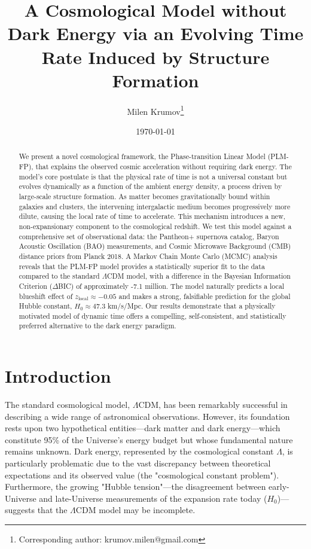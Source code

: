\documentclass[12pt, a4paper]{article}
\title{%
    A Cosmological Model without Dark Energy via an Evolving Time Rate Induced by Structure Formation
}
\author[1]{Milen Krumov\thanks{Corresponding author: krumov.milen@gmail.com}}
\affil[1]{Independent Researcher}
\date{\today}
\begin{document}
\maketitle

\begin{abstract}
We present a novel cosmological framework, the Phase-transition Linear Model (PLM-FP), that explains the observed cosmic acceleration without requiring dark energy. The model's core postulate is that the physical rate of time is not a universal constant but evolves dynamically as a function of the ambient energy density, a process driven by large-scale structure formation. As matter becomes gravitationally bound within galaxies and clusters, the intervening intergalactic medium becomes progressively more dilute, causing the local rate of time to accelerate. This mechanism introduces a new, non-expansionary component to the cosmological redshift. We test this model against a comprehensive set of observational data: the Pantheon+ supernova catalog, Baryon Acoustic Oscillation (BAO) measurements, and Cosmic Microwave Background (CMB) distance priors from Planck 2018. A Markov Chain Monte Carlo (MCMC) analysis reveals that the PLM-FP model provides a statistically superior fit to the data compared to the standard $\Lambda$CDM model, with a difference in the Bayesian Information Criterion ($\Delta$BIC) of approximately -7.1 million. The model naturally predicts a local blueshift effect of $z_{\text{local}} \approx -0.05$ and makes a strong, falsifiable prediction for the global Hubble constant, $H_0 \approx 47.3$ km/s/Mpc. Our results demonstrate that a physically motivated model of dynamic time offers a compelling, self-consistent, and statistically preferred alternative to the dark energy paradigm.
\end{abstract}

\section{Introduction}
The standard cosmological model, $\Lambda$CDM, has been remarkably successful in describing a wide range of astronomical observations. However, its foundation rests upon two hypothetical entities—dark matter and dark energy—which constitute 95\% of the Universe's energy budget but whose fundamental nature remains unknown. Dark energy, represented by the cosmological constant $\Lambda$, is particularly problematic due to the vast discrepancy between theoretical expectations and its observed value (the "cosmological constant problem"). Furthermore, the growing "Hubble tension"—the disagreement between early-Universe and late-Universe measurements of the expansion rate today ($H_0$)—suggests that the $\Lambda$CDM model may be incomplete.
\end{document}
